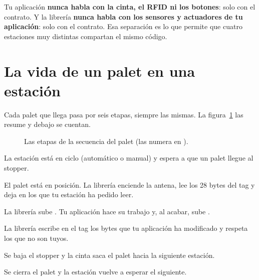 \begin{idea}
Tu aplicación \textbf{nunca habla con la cinta, el RFID ni los botones}: solo con el contrato. Y la librería \textbf{nunca habla con los sensores y actuadores de tu aplicación}: solo con el contrato. Esa separación es lo que permite que cuatro estaciones muy distintas compartan el mismo código.
\end{idea}

\section{La vida de un palet en una estación}
Cada palet que llega pasa por seis etapas, siempre las mismas. La figura~\ref{fig:vida} las resume y debajo se cuentan.

\begin{figure}[ht]
\centering
{}
\caption{Las etapas de la secuencia del palet (las numera  en ).}
\label{fig:vida}
\end{figure}

\begin{description}[style=nextline,leftmargin=1.2cm]
\item[0 -- Espera palet.] La estación está en ciclo (automático o manual) y espera a que un palet llegue al stopper.
\item[1 -- Leer tag.] El palet está en posición. La librería enciende la antena, lee los 28 bytes del tag y deja en  los que tu estación ha pedido leer.
\item[2 -- Aplicación.] La librería sube . Tu aplicación hace su trabajo y, al acabar, sube .
\item[3 -- Escribir tag.] La librería escribe en el tag los bytes que tu aplicación ha modificado y respeta los que no son tuyos.
\item[4 -- Evacuar.] Se baja el stopper y la cinta saca el palet hacia la siguiente estación.
\item[5 -- Fin palet.] Se cierra el palet y la estación vuelve a esperar el siguiente.
\end{description}

